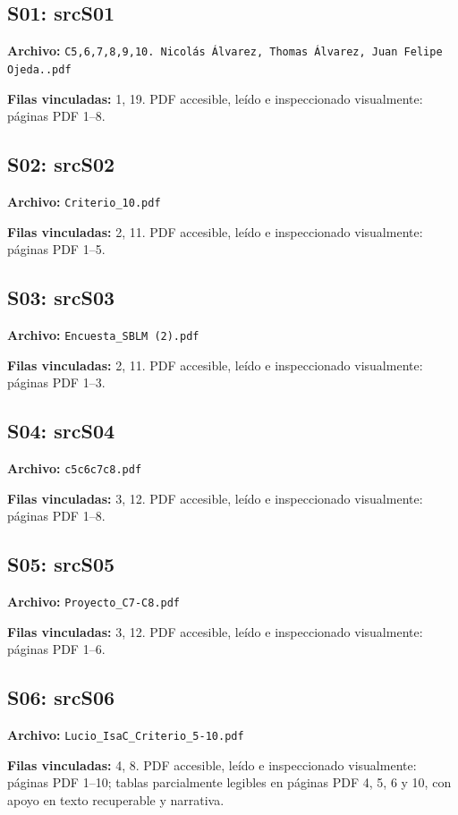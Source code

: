 \documentclass[11pt,a4paper]{article}
\begin{document}
\subsection*{\hypertarget{fuente-S01}{S01}: \csname srcS01\endcsname}
{\small\textbf{Archivo:} \texttt{C5,6,7,8,9,10. Nicolás Álvarez, Thomas Álvarez, Juan Felipe Ojeda..pdf}

\textbf{Filas vinculadas:} 1, 19. PDF accesible, leído e inspeccionado visualmente: páginas PDF 1--8.}
\subsection*{\hypertarget{fuente-S02}{S02}: \csname srcS02\endcsname}
{\small\textbf{Archivo:} \texttt{Criterio\_\allowbreak{}10.pdf}

\textbf{Filas vinculadas:} 2, 11. PDF accesible, leído e inspeccionado visualmente: páginas PDF 1--5.}
\subsection*{\hypertarget{fuente-S03}{S03}: \csname srcS03\endcsname}
{\small\textbf{Archivo:} \texttt{Encuesta\_\allowbreak{}SBLM (2).pdf}

\textbf{Filas vinculadas:} 2, 11. PDF accesible, leído e inspeccionado visualmente: páginas PDF 1--3.}
\subsection*{\hypertarget{fuente-S04}{S04}: \csname srcS04\endcsname}
{\small\textbf{Archivo:} \texttt{c5c6c7c8.pdf}

\textbf{Filas vinculadas:} 3, 12. PDF accesible, leído e inspeccionado visualmente: páginas PDF 1--8.}
\subsection*{\hypertarget{fuente-S05}{S05}: \csname srcS05\endcsname}
{\small\textbf{Archivo:} \texttt{Proyecto\_\allowbreak{}C7-C8.pdf}

\textbf{Filas vinculadas:} 3, 12. PDF accesible, leído e inspeccionado visualmente: páginas PDF 1--6.}
\subsection*{\hypertarget{fuente-S06}{S06}: \csname srcS06\endcsname}
{\small\textbf{Archivo:} \texttt{Lucio\_\allowbreak{}IsaC\_\allowbreak{}Criterio\_\allowbreak{}5-10.pdf}

\textbf{Filas vinculadas:} 4, 8. PDF accesible, leído e inspeccionado visualmente: páginas PDF 1--10; tablas parcialmente legibles en páginas PDF 4, 5, 6 y 10, con apoyo en texto recuperable y narrativa.}
\end{document}
